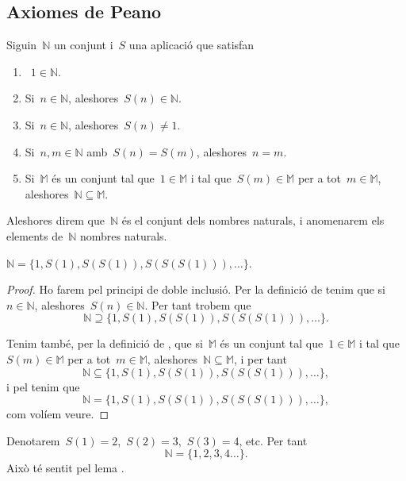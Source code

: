 \documentclass[../../main.tex]{subfiles}
\begin{document}
    \subsection{Axiomes de Peano}
    \begin{definition}
        \label{def:nombres-naturals}
        Siguin~\(\mathbb{N}\) un conjunt i~\(S\) una aplicació que satisfan
        \begin{enumerate}
            \item~\(1\in\mathbb{N}\).
            \item Si~\(n\in\mathbb{N}\), aleshores~\(S(n)\in\mathbb{N}\).
            \item Si~\(n\in\mathbb{N}\), aleshores~\(S(n)\neq1\).
            \item Si~\(n,m\in\mathbb{N}\) amb~\(S(n)=S(m)\), aleshores~\(n=m\).
            \item Si~\(\mathbb{M}\) és un conjunt tal que~\(1\in\mathbb{M}\) i tal que~\(S(m)\in\mathbb{M}\) per a tot~\(m\in\mathbb{M}\), aleshores~\(\mathbb{N}\subseteq\mathbb{M}\).
        \end{enumerate}
        Aleshores direm que~\(\mathbb{N}\) és el conjunt dels nombres naturals, i anomenarem els elements de~\(\mathbb{N}\) nombres naturals.
    \end{definition}
    \begin{lemma}
        \label{lema:primer-element}
        \(\mathbb{N}=\{1,S(1),S(S(1)),S(S(S(1))),\dots\}\).
    \end{lemma}
    \begin{proof}
        Ho farem pel principi de doble inclusió.
        Per la definició de  tenim que si~\(n\in\mathbb{N}\), aleshores~\(S(n)\in\mathbb{N}\).
        Per tant trobem que
        \[
            \mathbb{N}\supseteq\{1,S(1),S(S(1)),S(S(S(1))),\dots\}.
        \]

        Tenim també, per la definició de , que si~\(\mathbb{M}\) és un conjunt tal que~\(1\in\mathbb{M}\) i tal que~\(S(m)\in\mathbb{M}\) per a tot~\(m\in\mathbb{M}\), aleshores~\(\mathbb{N}\subseteq\mathbb{M}\), i per tant
        \[
            \mathbb{N}\subseteq\{1,S(1),S(S(1)),S(S(S(1))),\dots\},
        \]
        i pel  tenim que
        \[
            \mathbb{N}=\{1,S(1),S(S(1)),S(S(S(1))),\dots\},
        \]
        com volíem veure.
    \end{proof}
    \begin{notation}
        Denotarem~\(S(1)=2\),~\(S(2)=3\),~\(S(3)=4\), etc.
        Per tant
        \[
            \mathbb{N}=\{1,2,3,4\dots\}.
        \]
        Això té sentit pel lema .
    \end{notation}
\end{document}
